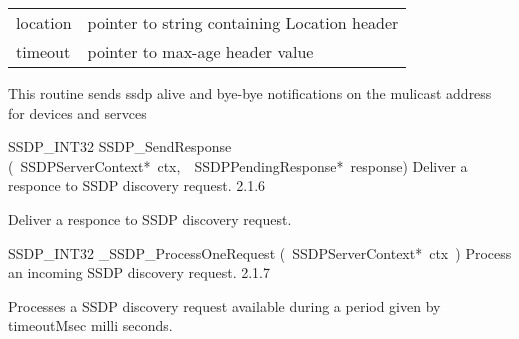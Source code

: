 \documentclass{article}
\begin{document}
\begin{cxxentry}
\begin{cxxentry}
\begin{cxxfunction}
{\begin{tabular}[t]{lp{}}
\\
{\tt\strut location} & pointer to string containing Location header 
\\
{\tt\strut timeout} & pointer to max-age header value 
\end{tabular}}
\begin{cxxdoc}
This routine sends ssdp alive and bye-bye notifications on the mulicast
address for devices and servces


\end{cxxdoc}
\end{cxxfunction}
\begin{cxxfunction}
{SSDP\_INT32}
        {SSDP\_SendResponse}
        {(\ SSDPServerContext*\ ctx,\ \ SSDPPendingResponse*\ response)}
        {Deliver a responce to SSDP discovery request.}
        {2.1.6}
\begin{cxxdoc}
Deliver a responce to SSDP discovery request.


\end{cxxdoc}
\end{cxxfunction}
\begin{cxxfunction}
{SSDP\_INT32}
        {\_SSDP\_ProcessOneRequest}
        {(\ SSDPServerContext*\ ctx\ )}
        {Process an incoming SSDP discovery request. }
        {2.1.7}
\begin{cxxdoc}
Processes a SSDP discovery request available during a period given by
timeoutMsec milli seconds.



\end{cxxdoc}
\end{cxxfunction}
\end{cxxentry}
\end{cxxentry}
\end{document}
